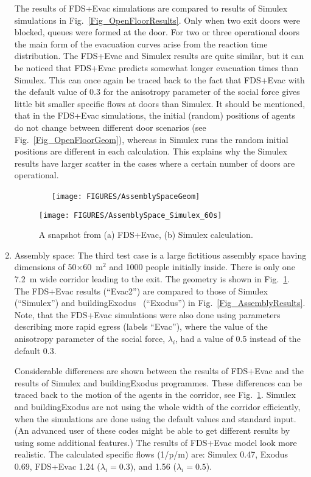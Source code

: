 \documentclass[12pt,a4paper,final,twoside]{stylevk}
\begin{document}
\begin{enumerate}
  The results of FDS+Evac simulations are compared to results of
  Simulex simulations in Fig.~\ref{Fig_OpenFloorResults}.  Only when
  two exit doors were blocked, queues were formed at the door.  For
  two or three operational doors the main form of the evacuation
  curves arise from the reaction time distribution.  The FDS+Evac and
  Simulex results are quite similar, but it can be noticed that
  FDS+Evac predicts somewhat longer evacuation times than Simulex.
  This can once again be traced back to the fact that FDS+Evac with
  the default value of 0.3 for the anisotropy parameter of the social
  force gives little bit smaller specific flows at doors than Simulex.
  It should be mentioned, that in the FDS+Evac simulations, the
  initial (random) positions of agents do not change between different
  door scenarios (see Fig.~\ref{Fig_OpenFloorGeom}), whereas in
  Simulex runs the random initial positions are different in each
  calculation.  This explains why the Simulex results have larger
  scatter in the cases where a certain number of doors are
  operational.\vspace{\fill}


%
\begin{figure}[!tb]
  \centerline{~~~\texttt{[image: FIGURES/AssemblySpaceGeom]}} 
  \centerline{\texttt{[image: FIGURES/AssemblySpace\_Simulex\_60s]}} 
  \caption{A snapshot from (a) FDS+Evac, (b) Simulex
    calculation.}\label{Fig_AssemblySnapshots} 
\end{figure}
%

\pagebreak[3]
%
\item Assembly space: The third test case is a large fictitious
  assembly space having dimensions of 50$\times$60~$\mathrm{m^2}$ and
  1000 people initially inside.  There is only one 7.2~m wide corridor
  leading to the exit.  The geometry is shown in
  Fig.~\ref{Fig_AssemblySnapshots}.  The FDS+Evac results (``Evac2'')
  are compared to those of Simulex (``Simulex'') and
  buildingExodus~\cite{Exodus3} (``Exodus'') in
  Fig.~\ref{Fig_AssemblyResults}.  Note, that the FDS+Evac simulations
  were also done using parameters describing more rapid egress
  (labels ``Evac''), where the value of the anisotropy
  parameter of the social force, $\lambda_i$, had a value of 0.5
  instead of the default 0.3.
  
  Considerable differences are shown between the results of FDS+Evac
  and the results of Simulex and buildingExodus programmes.  These
  differences can be traced back to the motion of the agents in the
  corridor, see Fig.~\ref{Fig_AssemblySnapshots}.  Simulex and
  buildingExodus are not using the whole width of the corridor
  efficiently, when the simulations are done using the default values
  and standard input.  (An advanced user of these codes might be able
  to get different results by using some additional features.)  The
  results of FDS+Evac model look more realistic.  The calculated
  specific flows (1/p/m) are: Simulex 0.47, Exodus 0.69, FDS+Evac 1.24
  ($\lambda_i=0.3$), and 1.56 ($\lambda_i=0.5$).
  

\end{enumerate}
\end{document}
